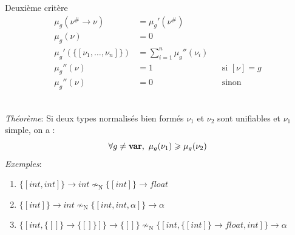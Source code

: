 \documentclass[serif]{beamer}
\newcommand{\exemples}{\textit{Exemples}\xspace}
\newcommand{\theoreme}{\textit{Théorème}\xspace}
\newcommand{\interval}[2]{[\![#1\,;#2]\!]}
\newcommand{\mset}[1]{\{\![#1]\!\}}
\newcommand{\N}{\mathrm{N}}
\begin{document}

\begin{frame}{Deuxième critère}
\scriptsize
\begin{align*}
		\mu_g (\nu^\# \rightarrow \nu) &=
		\mu_g' (\nu^\#)
	\\
		\mu_g (\nu) &=
		0
	\\
		\mu_g' (\mset{\nu_1, \dots, \nu_n}) &=
		\sum_{i=1}^n \mu_g'' (\nu_i)
	\\
		\mu_g'' (\nu) &=
		1 &&
		\text{si } [\nu] = g
	\\
		\mu_g'' (\nu) &=
		0 &&
		\text{sinon}
\end{align*}
\medskip
{}
\\
\theoreme : Si deux types normalisés bien formés $\nu_1$ et $\nu_2$ sont unifiables et $\nu_1$ simple, on a :
\[ \forall g \neq \bold{var},\ \mu_g (\nu_1) \geqslant \mu_g (\nu_2) \]
\exemples :
\begin{enumerate}
	\item $\mset{int, int} \rightarrow int \nsim_\N \mset{int} \rightarrow float$
	\item $\mset{int} \rightarrow int \nsim_\N \mset{int, int, \alpha} \rightarrow \alpha$
	\item $\mset{int, \mset{} \rightarrow \mset{}} \rightarrow \mset{} \nsim_\N \mset{int, \mset{int} \rightarrow float, int} \rightarrow \alpha$
\end{enumerate}
\end{frame}

\end{document}
